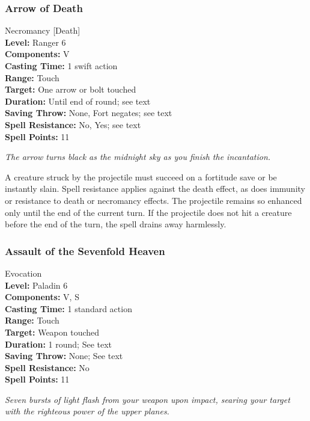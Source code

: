 \subsubsection{Arrow of Death}
\label{Spell:ArrowOfDeath}
Necromancy [Death]
\\ \textbf{Level:} Ranger 6
\\ \textbf{Components:} V
\\ \textbf{Casting Time:} 1 swift action
\\ \textbf{Range:} Touch
\\ \textbf{Target:} One arrow or bolt touched
\\ \textbf{Duration:} Until end of round; see text
\\ \textbf{Saving Throw:} None, Fort negates; see text
\\ \textbf{Spell Resistance:} No, Yes; see text
\\ \textbf{Spell Points:} 11

\emph{The arrow turns black as the midnight sky as you finish the incantation.}

A creature struck by the projectile must succeed on a fortitude save or be instantly slain.
Spell resistance applies against the death effect, as does immunity or resistance to death or necromancy effects.
The projectile remains so enhanced only until the end of the current turn. 
If the projectile does not hit a creature before the end of the turn, the spell drains away harmlessly.
\subsubsection{Assault of the Sevenfold Heaven}
\label{Spell:AssaultOfTheSevenFoldHeaven}
Evocation
\\ \textbf{Level:} Paladin 6
\\ \textbf{Components:} V, S
\\ \textbf{Casting Time:} 1 standard action
\\ \textbf{Range:} Touch
\\ \textbf{Target:} Weapon touched
\\ \textbf{Duration:} 1 round; See text
\\ \textbf{Saving Throw:} None; See text
\\ \textbf{Spell Resistance:} No
\\ \textbf{Spell Points:} 11

\emph{Seven bursts of light flash from your weapon upon impact, searing your target with the righteous power of the upper planes.}

